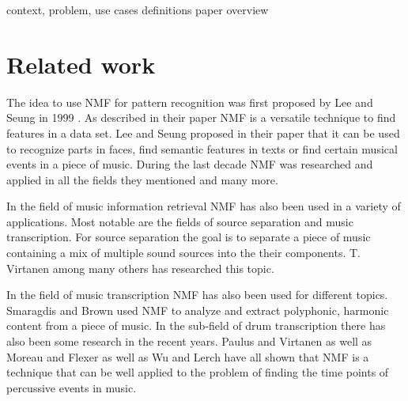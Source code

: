 \documentclass{article}
\begin{document}
\noindent\makebox[\linewidth]{\rule{\linewidth}{0.4pt}}
context, problem, use cases
definitions
paper overview




\section{Related work}
\label{sec:rel}

The idea to use NMF for pattern recognition was first proposed by Lee and Seung in 1999 \cite{lee1999}.
As described in their paper NMF is a versatile technique to find features in a data set.
Lee and Seung proposed in their paper that it can be used to recognize parts in faces, find semantic features in texts or find certain musical events in a piece of music.
During the last decade NMF was researched and applied in all the fields they mentioned and many more.

In the field of music information retrieval NMF has also been used in a variety of applications.
Most notable are the fields of source separation and music transcription.
For source separation the goal is to separate a piece of music containing a mix of multiple sound sources into the their components.
T. Virtanen \cite{virtanen2007} among many others has researched this topic.

In the field of music transcription NMF has also been used for different topics.
Smaragdis and Brown \cite{smaragdis2003} used NMF to analyze and extract polyphonic, harmonic content from a piece of music.
In the sub-field of drum transcription there has also been some research in the recent years.
Paulus and Virtanen \cite{paulus2005} as well as Moreau and Flexer \cite{moreau2007} as well as Wu and Lerch \cite{wu2015} have all shown that NMF is a technique that can be well applied to the problem of finding the time points of percussive events in music.
\end{document}
